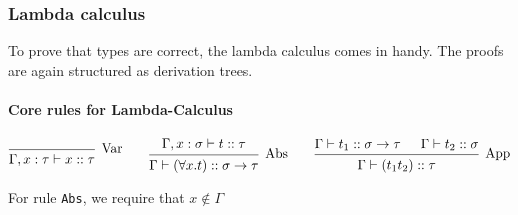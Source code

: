 \subsubsection{Lambda calculus}
To prove that types are correct, the lambda calculus comes in handy.
The proofs are again structured as derivation trees.

\paragraph{Core rules for Lambda-Calculus}
\[
    \begin{prooftree}
        \infer0[Var]{\Gamma, x : \tau \vdash x :: \tau}
    \end{prooftree}
    \qquad
    \begin{prooftree}
        \hypo{\Gamma, x : \sigma \vdash t :: \tau}
        \infer1[Abs]{\Gamma \vdash (\forall x. t) :: \sigma \rightarrow \tau}
    \end{prooftree}
    \qquad
    \begin{prooftree}
        \hypo{\Gamma \vdash t_1 :: \sigma \rightarrow \tau}
        \hypo{\Gamma \vdash t_2 :: \sigma}
        \infer2[App]{\Gamma \vdash (t_1 t_2) :: \tau}
    \end{prooftree}
\]

For rule \texttt{Abs}, we require that $x \notin \Gamma$
